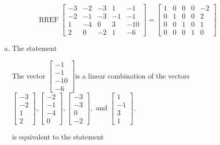 \begin{exerciseAnswer} 
\[\operatorname{RREF}  \left[\begin{array}{cccc|c}
-3 & -2 & -3 & 1 & -1 \\
-2 & -1 & -3 & -1 & -1 \\
1 & -4 & 0 & 3 & -10 \\
2 & 0 & -2 & 1 & -6
\end{array}\right] = \left[\begin{array}{cccc|c}
1 & 0 & 0 & 0 & -2 \\
0 & 1 & 0 & 0 & 2 \\
0 & 0 & 1 & 0 & 1 \\
0 & 0 & 0 & 1 & 0
\end{array}\right] \]
\begin{enumerate}[(a)]
\item  The statement 
\begin{center}\begin{minipage}{0.8\textwidth}
 The vector \( \left[\begin{array}{c}
-1 \\
-1 \\
-10 \\
-6
\end{array}\right] \)is a linear combination of the vectors \( \left[\begin{array}{c}
-3 \\
-2 \\
1 \\
2
\end{array}\right] , \left[\begin{array}{c}
-2 \\
-1 \\
-4 \\
0
\end{array}\right] , \left[\begin{array}{c}
-3 \\
-3 \\
0 \\
-2
\end{array}\right] , \text{ and } \left[\begin{array}{c}
1 \\
-1 \\
3 \\
1
\end{array}\right] \). 
\end{minipage}\end{center}
     is equivalent to the statement 
\begin{center}\begin{minipage}{0.8\textwidth}

\end{minipage}
\end{center}
\end{enumerate}
\end{exerciseAnswer}
